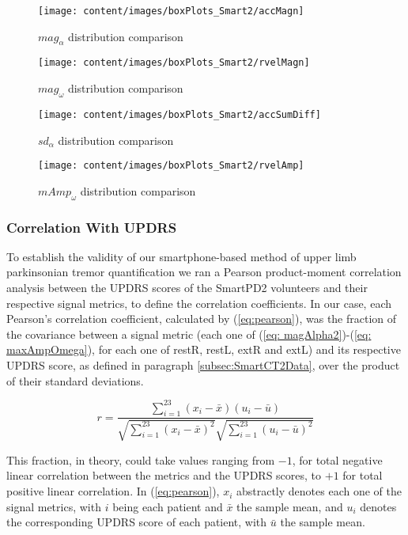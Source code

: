 \begin{figure}[!hp]
  \centering
  \texttt{[image: content/images/boxPlots\_Smart2/accMagn]}
  \caption{$mag_{\alpha}$ distribution comparison}
  \label{fig:boxAccMag}
  \texttt{[image: content/images/boxPlots\_Smart2/rvelMagn]}
  \caption{$mag_{\omega}$ distribution comparison}
  \label{fig:boxRvelMag}
\end{figure}
\begin{figure}[!hp]
  \centering
  \texttt{[image: content/images/boxPlots\_Smart2/accSumDiff]}
  \caption{$sd_{\alpha}$ distribution comparison}
  \label{fig:boxAccSumDiff}
  \texttt{[image: content/images/boxPlots\_Smart2/rvelAmp]}
  \caption{$mAmp_{\omega}$ distribution comparison}
  \label{fig:boxRvelAmp}
\end{figure}





\subsubsection{Correlation With UPDRS}
\label{subsubsec:SmartCT2Correlation}
To establish the validity of our smartphone-based method of upper limb parkinsonian tremor quantification we ran a Pearson product-moment correlation analysis between the \gls{UPDRS} scores of the \gls{SmartPD2} volunteers and their respective signal metrics, to define the correlation coefficients. In our case, each Pearson's correlation coefficient, calculated by (\ref{eq:pearson}), was the fraction of the covariance between a signal metric (each one of (\ref{eq: magAlpha2})-(\ref{eq: maxAmpOmega}), for each one of restR, restL, extR and extL) and its respective \gls{UPDRS} score, as defined in paragraph \ref{subsec:SmartCT2Data}, over the product of their standard deviations. 

\begin{equation} \label{eq:pearson}
r = \frac{ \sum_{i=1}^{23} (x_{i} - \bar{x})(u_{i} - \bar{u}) } 
		 { \sqrt{\sum_{i=1}^{23} (x_{i} - \bar{x})^{2}} \sqrt{\sum_{i=1}^{23} (u_{i} - \bar{u})^{2}} }
\end{equation}

\noindent
This fraction, in theory, could take values ranging from $-1$, for total negative linear correlation between the metrics and the \gls{UPDRS} scores, to $+1$ for total positive linear correlation. In (\ref{eq:pearson}), $x_{i}$ abstractly denotes each one of the signal metrics, with $i$ being each patient and $\bar{x}$ the sample mean, and $u_{i}$ denotes the corresponding \gls{UPDRS} score of each patient, with $\bar{u}$ the sample mean.

